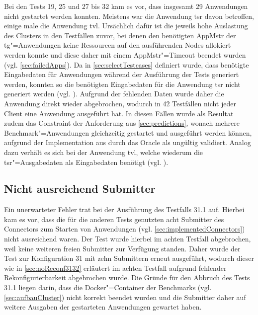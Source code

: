 Bei den Tests 19, 25 und 27 bis 32 kam es vor, dass insgesamt 29 Anwendungen nicht gestartet werden konnten.
Meistens war die Anwendung \acl{tsr} davon betroffen, einige male die Anwendung \acl{tvl}.
Ursächlich dafür ist die jeweils hohe Auslastung des Clusters in den Testfällen zuvor, bei denen den benötigten \ac{AppMstr} der \acl{tg}"=Anwendungen keine Ressourcen auf den ausführenden Nodes allokiert werden konnte und diese daher mit einem \ac{AppMstr}"=Timeout beendet wurden (vgl. \autoref{sec:failedApps}).
Da in \autoref{sec:selectTestcases} definiert wurde, dass benötigte Eingabedaten für Anwendungen während der Ausführung der Tests generiert werden, konnten so die benötigten Eingabedaten für die Anwendung \acl{tsr} nicht generiert werden (vgl. ).
Aufgrund der fehlenden Daten wurde daher die Anwendung direkt wieder abgebrochen, wodurch in 42 Testfällen nicht jeder Client eine Anwendung ausgeführt hat.
In diesen Fällen wurde als Resultat zudem das Constraint der Anforderung aus \autoref{sec:predictions}, wonach mehrere Benchmark"=Anwendungen gleichzeitig gestartet und ausgeführt werden können, aufgrund der Implementation aus  durch das Oracle als ungültig validiert.
Analog dazu verhält es sich bei der Anwendung \acl{tvl}, welche wiederum die \acl{tsr}"=Ausgabedaten als Eingabedaten benötigt (vgl. ).

\subsection{Nicht ausreichend Submitter}
\label{sec:notEnoughSubmitter}

Ein unerwarteter Fehler trat bei der Ausführung des Testfalls 31.1 auf.
Hierbei kam es vor, dass die für die anderen Tests genutzten acht Submitter des Connectors zum Starten von Anwendungen (vgl. \autoref{sec:implementedConnectors}) nicht ausreichend waren.
Der Test wurde hierbei im achten Testfall abgebrochen, weil keine weiteren freien Submitter zur Verfügung standen.
Daher wurde der Test zur Konfiguration 31 mit zehn Submittern erneut ausgeführt, wodurch dieser wie in \autoref{sec:noReconf3132} erläutert im achten Testfall aufgrund fehlender Rekonfigurierbarkeit abgebrochen wurde.
Die Gründe für den Abbruch des Tests 31.1 liegen darin, dass die Docker"=Container der Benchmarks (vgl. \autoref{sec:aufbauCluster}) nicht korrekt beendet wurden und die Submitter daher auf weitere Ausgaben der gestarteten Anwendungen gewartet haben.
